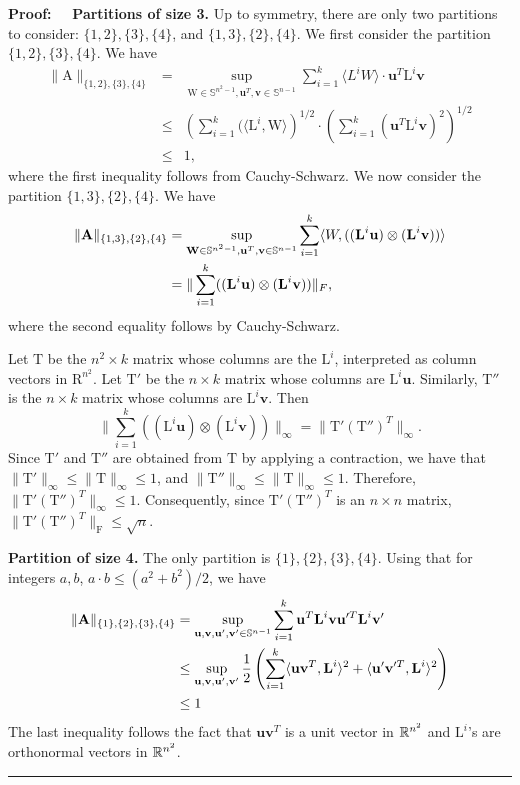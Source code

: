 \documentclass[11pt]{article}
\newcommand{\R}{\ensuremath\mathbb{R}}
\newcommand{\FNorm }[1]{\mbox{}\|#1\|_\mathrm{F}  }
\newenvironment{proof}{\begin{trivlist} \item {\bf Proof:~~}}
  {\qed\end{trivlist}}
\newcommand{\mat}[1]{{\ensuremath{\bm{\mathrm{#1}}}}}
\def\u{{\mathbf u}}
\def\ve{{\mathbf v}}
\def\matA{\mat{A}}
\def\matL{\mat{L}}
\def\matR{\mat{R}}
\def\matT{\mat{T}}
\def\matW{\mat{W}}
\def\frac#1#2{{#1\over #2}}
\def\qed{\hfill\rule{2mm}{2mm}}
\begin{document}
\begin{proof}
\noindent\textbf{Partitions of size 3.} Up to symmetry, there are only two partitions to consider:
$\{1,2\}, \{3\}, \{4\}$, and $\{1,3\}, \{2\}, \{4\}$. We first consider the partition $\{1, 2\}, \{3\}, \{4\}$. We have
\begin{eqnarray*}
\|\matA\|_{\{1,2\},\{3\},\{4\}} &=& \sup_{\matW \in \mathbb{S}^{n^2-1}, \u^T, \ve \in \mathbb{S}^{n-1}} \sum_{i=1}^k 
\langle L^i W \rangle \cdot \u^T \matL^i \ve\\
&\leq & \left (\sum_{i=1}^k (\langle \matL^i, \matW \rangle \right )^{1/2} \cdot \left (\sum_{i=1}^k (\u^T \matL^i \ve)^2 \right )^{1/2}\\
&\leq & 1,
\end{eqnarray*}
where the first inequality follows from Cauchy-Schwarz. We now consider the partition $\{1, 3\}, \{2\}, \{4\}$. We have
\begin{eqnarray}\label{eqn:oded}
\|\matA\|_{\{1,3\},\{2\},\{4\}} &= \sup_{\matW \in \mathbb{S}^{n^2-1}, \u^T, \ve \in \mathbb{S}^{n-1}} \sum_{i=1}^k \langle W, ((\matL^i \u) \otimes
(\matL^i \ve)) \rangle \notag \\
& = \|\sum_{i=1}^k ((\matL^i \u) \otimes (\matL^i \ve))\|_{F},
\end{eqnarray}
where the second equality follows by Cauchy-Schwarz.

Let $\matT$ be the $n^2 \times k$ matrix whose columns are the $\matL^i$, interpreted as column vectors in $\matR^{n^2}$. 
Let $\matT'$ be the $n \times k$ matrix whose columns are $\matL^i \u$. 
Similarly, $\matT''$ is the $n \times k$ matrix whose columns are $\matL^i \ve$. Then 
$$ \|\sum_{i=1}^k ((\matL^i \u) \otimes (\matL^i \ve))\|_{\infty} = \|\matT' (\matT'')^T\|_{\infty}.$$
Since $\matT'$ and $\matT''$ are obtained from $\matT$ by applying a contraction, we have that
$\|\matT'\|_{\infty} \leq \|\matT\|_{\infty} \leq 1$, and 
$\|\matT''\|_{\infty} \leq \|\matT\|_{\infty} \leq 1$. Therefore, $\|\matT' (\matT'')^T\|_{\infty} \leq 1$. Consequently, 
since $\matT' (\matT'')^T$ is an $n \times n$ matrix, $\FNorm{\matT' (\matT'')^T} \leq \sqrt{n}$. 

\noindent\textbf{Partition of size 4.}
The only partition is $\{1\},\{2\},\{3\},\{4\}$. Using that for integers $a,b$, $a \cdot b \leq (a^2+b^2)/2$, we have
\begin{align*}
\|\matA\|_{\{1\},\{2\},\{3\},\{4\}} &= \sup_{\u,\ve,\u',\ve'\in \mathbb{S}^{n-1}} \sum_{i=1}^k \u^T \matL^i \ve \u'^T \matL^i \ve'\\
&\le \sup_{\u,\ve,\u',\ve'} \frac{1}{2}\left(\sum_{i=1}^k \langle \u\ve^T, \matL^i\rangle^2 + \langle \u'\ve'^T, \matL^i\rangle^2\right) \\
&\le 1
\end{align*}
The last inequality follows the fact that $\u\ve^T$ is a unit vector in $\R^{n^2}$ and $\matL^i$'s are orthonormal vectors in $\R^{n^2}$.


\end{proof}
\end{document}
